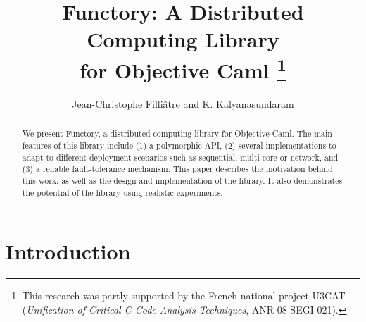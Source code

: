 \documentclass{llncs}
\newcommand{\Ocaml}{OCaml}
\newcommand{\functory}{\textsf{Functory}}
\begin{document}
\title{Functory: A Distributed Computing Library \\ for Objective Caml 
\thanks{This
    research was partly supported by the French national project U3CAT
    (\emph{Unification of Critical C Code Analysis Techniques},
    ANR-08-SEGI-021).}}

\author{Jean-Christophe Filli\^{a}tre and K. Kalyanasundaram}


\maketitle

\begin{abstract}
  We present Functory, a distributed computing library for
  Objective Caml. The main features of this library
  include (1) a polymorphic API, (2) several implementations to
  adapt to different deployment scenarios such as sequential,
  multi-core or network, and (3) a reliable fault-tolerance mechanism.
  This paper describes the motivation behind this work, as well as
  the design and implementation of the library. It also demonstrates
  the potential of the library using realistic experiments.
\end{abstract}


\section{Introduction}

\end{document}
